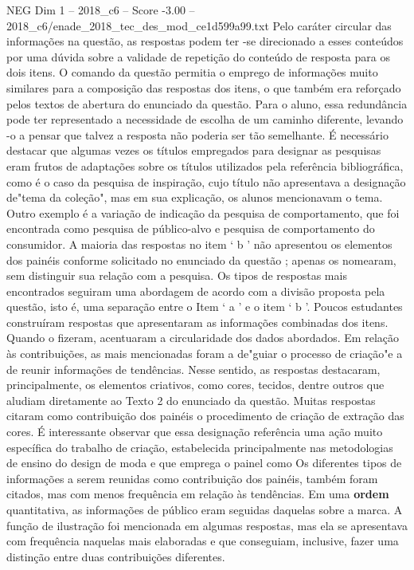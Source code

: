 \begin{textsample}{NEG Dim 1 – 2018\_c6 – Score -3.00 – 2018\_c6/enade\_2018\_tec\_des\_mod\_ce1d599a99.txt}
Pelo caráter circular das informações na questão, as respostas podem ter -se direcionado a esses conteúdos por uma dúvida sobre a validade de repetição do conteúdo de resposta para os dois itens.
O comando da questão permitia o emprego de informações muito similares para a composição das respostas dos itens, o que também era reforçado pelos textos de abertura do enunciado da questão.
Para o aluno, essa redundância pode ter representado a necessidade de escolha de um caminho diferente, levando -o a pensar que talvez a resposta não poderia ser tão semelhante.
É necessário destacar que algumas vezes os títulos empregados para designar as pesquisas eram frutos de adaptações sobre os títulos utilizados pela referência bibliográfica, como é o caso da pesquisa de inspiração, cujo título não apresentava a designação de"tema da coleção", mas em sua explicação, os alunos mencionavam o tema.
Outro exemplo é a variação de indicação da pesquisa de comportamento, que foi encontrada como pesquisa de público-alvo e pesquisa de comportamento do consumidor.
A maioria das respostas no item ‘ b ’ não apresentou os elementos dos painéis conforme solicitado no enunciado da questão ; apenas os nomearam, sem distinguir sua relação com a pesquisa.
Os tipos de respostas mais encontrados seguiram uma abordagem de acordo com a divisão proposta pela questão, isto é, uma separação entre o Item ‘ a ’ e o item ‘ b ’.
Poucos estudantes construíram respostas que apresentaram as informações combinadas dos itens.
Quando o fizeram, acentuaram a circularidade dos dados abordados.
Em relação às contribuições, as mais mencionadas foram a de"guiar o processo de criação"e a de reunir informações de tendências.
Nesse sentido, as respostas destacaram, principalmente, os elementos criativos, como cores, tecidos, dentre outros que aludiam diretamente ao Texto 2 do enunciado da questão.
Muitas respostas citaram como contribuição dos painéis o procedimento de criação de extração das cores.
É interessante observar que essa designação referência uma ação muito específica do trabalho de criação, estabelecida principalmente nas metodologias de ensino do design de moda e que emprega o painel como Os diferentes tipos de informações a serem reunidas como contribuição dos painéis, também foram citados, mas com menos frequência em relação às tendências.
Em uma \textbf{ordem} quantitativa, as informações de público eram seguidas daquelas sobre a marca.
A função de ilustração foi mencionada em algumas respostas, mas ela se apresentava com frequência naquelas mais elaboradas e que conseguiam, inclusive, fazer uma distinção entre duas contribuições diferentes.

\end{textsample}
